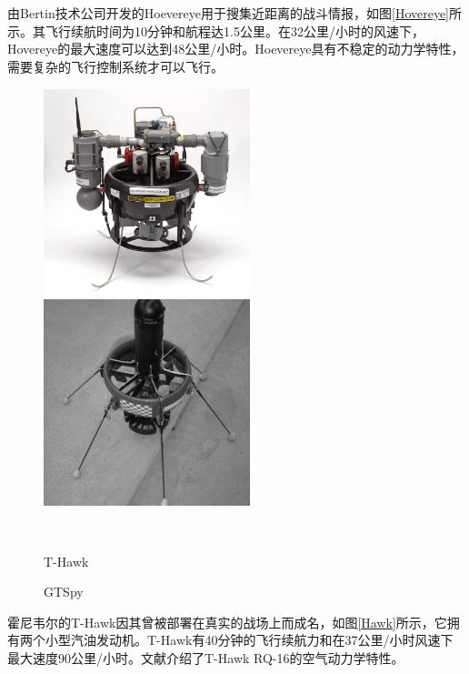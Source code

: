 由Bertin技术公司开发的Hoevereye用于搜集近距离的战斗情报，如图\ref{Hovereye}所示。其飞行续航时间为10分钟和航程达1.5公里。在32公里/小时的风速下，Hovereye的最大速度可以达到48公里/小时。Hoevereye具有不稳定的动力学特性，需要复杂的飞行控制系统才可以飞行\cite{Pflimlin_2006,Pflimlin_2007,Pflimlin_2007a,Pflimlin_2010}。
\begin{figure}[htbp]
	\centering
	\begin{minipage}[c]{0.5\textwidth}
		\centering
		\includegraphics[width=6cm,height=6cm]{Fig/honeywell_t-hawk.jpg}
	\end{minipage}%
	\begin{minipage}[c]{0.5\textwidth}
		\centering
		\includegraphics[width=6cm,height=6cm]{Fig/GTSpy.jpg}
	\end{minipage}\\[1pt]
	\begin{minipage}[t]{.5\textwidth}
		\caption{\label{Hawk}T-Hawk}
	\end{minipage}%
	\begin{minipage}[t]{.5\textwidth}
		\caption{\label{GTSpy}GTSpy}
	\end{minipage}%
\end{figure}

霍尼韦尔的T-Hawk因其曾被部署在真实的战场上而成名，如图\ref{Hawk}所示，它拥有两个小型汽油发动机。T-Hawk有40分钟的飞行续航力和在37公里/小时风速下最大速度90公里/小时。文献\parencite{Fleming_2004}介绍了T-Hawk RQ-16的空气动力学特性。

